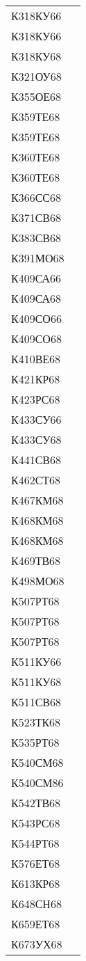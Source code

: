 \documentclass[a4paper,12pt]{article}
\begin{document}
\begin{longtable}{ ll }
К318КУ66 &  \\ 
К318КУ66 &  \\ 
К318КУ68 &  \\ 
К321ОУ68 &  \\ 
К355ОЕ68 &  \\ 
К359ТЕ68 &  \\ 
К359ТЕ68 &  \\ 
К360ТЕ68 &  \\ 
К360ТЕ68 &  \\ 
К366СС68 &  \\ 
К371СВ68 &  \\ 
К383СВ68 &  \\ 
К391МО68 &  \\ 
К409СА66 &  \\ 
К409СА68 &  \\ 
К409СО66 &  \\ 
К409СО68 &  \\ 
К410ВЕ68 &  \\ 
К421КР68 &  \\ 
К423РС68 &  \\ 
К433СУ66 &  \\ 
К433СУ68 &  \\ 
К441СВ68 &  \\ 
К462СТ68 &  \\ 
К467КМ68 &  \\ 
К468КМ68 &  \\ 
К468КМ68 &  \\ 
К469ТВ68 &  \\ 
К498МО68 &  \\ 
К507РТ68 &  \\ 
К507РТ68 &  \\ 
К507РТ68 &  \\ 
К511КУ66 &  \\ 
К511КУ68 &  \\ 
К511СВ68 &  \\ 
К523ТК68 &  \\ 
К535РТ68 &  \\ 
К540СМ68 &  \\ 
К540СМ86 &  \\ 
К542ТВ68 &  \\ 
К543РС68 &  \\ 
К544РТ68 &  \\ 
К576ЕТ68 &  \\ 
К613КР68 &  \\ 
К648СН68 &  \\ 
К659ЕТ68 &  \\ 
К673УХ68 &  \\ 

\end{longtable}
\end{document}
